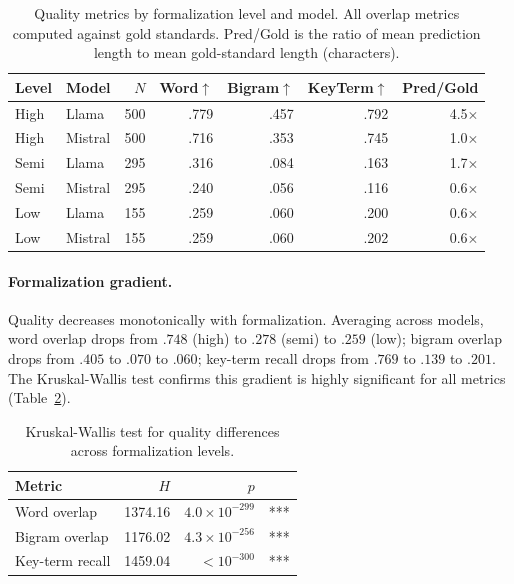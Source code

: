 \documentclass[runningheads]{llncs}
\begin{document}
\begin{table}[h]
\centering
\caption{Quality metrics by formalization level and model. All overlap metrics computed against gold standards. Pred/Gold is the ratio of mean prediction length to mean gold-standard length (characters).}
\label{tab:quality}
\begin{tabular}{llrrrrr}
\toprule
Level & Model & $N$ & Word$\uparrow$ & Bigram$\uparrow$ & KeyTerm$\uparrow$ & Pred/Gold \\
\midrule
High  & Llama   & 500 & .779 & .457 & .792 & 4.5$\times$ \\
High  & Mistral & 500 & .716 & .353 & .745 & 1.0$\times$ \\
Semi  & Llama   & 295 & .316 & .084 & .163 & 1.7$\times$ \\
Semi  & Mistral & 295 & .240 & .056 & .116 & 0.6$\times$ \\
Low   & Llama   & 155 & .259 & .060 & .200 & 0.6$\times$ \\
Low   & Mistral & 155 & .259 & .060 & .202 & 0.6$\times$ \\
\bottomrule
\end{tabular}
\end{table}

\paragraph{Formalization gradient.}
Quality decreases monotonically with formalization. Averaging across models, word overlap drops from $.748$ (high) to $.278$ (semi) to $.259$ (low); bigram overlap drops from $.405$ to $.070$ to $.060$; key-term recall drops from $.769$ to $.139$ to $.201$. The Kruskal-Wallis test confirms this gradient is highly significant for all metrics (Table~\ref{tab:kruskal}).

\begin{table}[h]
\centering
\caption{Kruskal-Wallis test for quality differences across formalization levels.}
\label{tab:kruskal}
\begin{tabular}{lrrl}
\toprule
Metric & $H$ & $p$ & \\
\midrule
Word overlap    & 1374.16 & $4.0 \times 10^{-299}$ & *** \\
Bigram overlap  & 1176.02 & $4.3 \times 10^{-256}$ & *** \\
Key-term recall & 1459.04 & $< 10^{-300}$ & *** \\
\bottomrule
\end{tabular}
\end{table}
\end{document}
